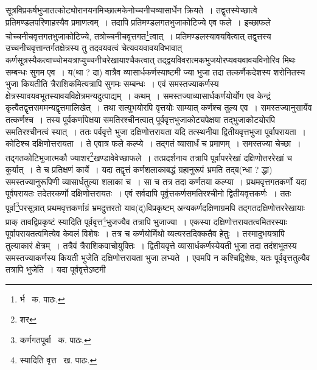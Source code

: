 \documentclass[11pt, openany]{book}
\begin{document}
\noindent सूत्रविप्रकर्षभुजातत्कोट्योरानयनमिच्छात्मकेनोच्चनीचव्यासार्धेन क्रियते~। तद्वृत्तस्येच्छात्वे प्रतिमण्डलपरिणाहस्यैव प्रमाणत्वम्~। तदापि
प्रतिमण्डलगतभुजाकोटिज्ये एव फले~। इच्छाफले चोच्चनीचवृत्तगतभुजाकोटिज्ये, तत्रोच्चनीचवृत्तगत\renewcommand{\thefootnote}{१}\footnote{र्भ \textendash\ क. पाठः.}त्वात्~। प्रतिमण्डलस्यावयवित्वात् तद्वृत्तस्य उच्चनीचवृत्तान्तर्गतक्षेत्रस्य तु तदवयवत्वं चेत्यवयवावयविभावात् कर्णसूत्रस्यैकत्वाच्चोभयत्राप्युच्चनीचरेखायाश्चैकत्वात् तद्द्वयविवरात्मकभुजयोरप्यवयवावयविनोरिव मिथः सम्बन्धः सुगम एव~। य(था ? दा) वात्रैव व्यासार्धकर्णस्याष्टमी ज्या भुजा तदा तत्कर्णैकदेशस्य शरोनितस्य भुजा कियतीति त्रैराशिकमित्यत्रापि सुगमः सम्बन्धः~। एवं समस्तज्याकर्णस्य क्षेत्रस्यावयवभूतस्यावयविक्षेत्रमन्यदुत्पाद्यम्~। कथम्~। समस्तज्याव्यासार्धकर्णयोर्योग एव केन्द्रं कृत्वैतद्वृत्तसममन्यद्वृत्तमालिखेत्~। तथा सत्युभयोरपि वृत्तयोः साम्यात् कर्णश्च तुल्य एव~। समस्तज्यानुसार्येव तत्कर्णश्च~। तस्य पूर्वकर्णापेक्षया समतिरश्चीनत्वात् पूर्ववृत्तभुजाकोट्यपेक्षया तद्भुजाकोट्योरपि समतिरश्चीनत्वं स्यात्~। ततः पर्ववृत्ते भुजा दक्षिणोत्तरायता यदि तत्स्थनीया द्वितीयवृत्तभुजा पूर्वापरायता~। कोटिश्च दक्षिणोत्तरायता~। ते एवात्र फले कल्प्ये~। तद्गतं व्यासार्धं च प्रमाणम्~। समस्तज्या चेच्छा~। तद्गतकोटिभुजात्मकौ ज्याशर\renewcommand{\thefootnote}{२}\footnote{शर}खण्डावेवेच्छाफले~। तत्प्रदर्शनाय तत्रापि पूर्वापररेखां
दक्षिणोत्तररेखां च कुर्यात्~। ते च प्रतिक्षणं कार्ये~। यदा तद्वृत्तं कर्णशलाकाबद्धं ग्रहानुरूपं भ्रमति तद्ब(न्धा ? द्धा) समस्तज्यानुरूपिणी
व्यासार्धतुल्या शलाका च~। सा च तत्र तदा कर्णतया कल्प्या~। प्रथमवृत्तगतकर्णो यदा पूर्वपरायतः तदेतरकर्णो दक्षिणोत्तरायतः~। एवं सर्वदापि
पूर्वृत्तकर्णसमतिरश्चीनो द्वितीयवृत्तकर्णः~। ततः पूर्वा\renewcommand{\thefootnote}{३}\footnote{कर्णगतपूर्वा \textendash\ क. पाठः.}परसूत्रात् प्रथमवृत्तकर्णाग्रं भ्रमदुत्तरतो याव(द्)विप्रकृष्टम् अन्यकर्णदक्षिणाग्रमपि तद्गतदक्षिणोत्तररेखायाः प्राक् तावद्विप्रकृष्टं स्यादिति पूर्ववृत्त\renewcommand{\thefootnote}{४}\footnote{स्यादिति वृत्त \textendash\ ख. पाठः.}भुजज्यैव तत्रापि भुजाज्या~। एकस्या दक्षिणोत्तरायतत्वमितरस्याः पूर्वापरायतत्वमित्येव केवलं विशेषः~। तत्र च कर्णयोर्मिथो व्यत्यस्तदिक्कतैव हेतुः~। तस्मादुभयत्रापि तुल्याकारं क्षेत्रम्~। तत्रैवं त्रैराशिकवाचोयुक्तिः~। द्वितीयवृत्ते व्यासार्धकर्णस्येयती भुजा तदा तदंशभूतस्य समस्तज्याकर्णस्य कियती भुजेति दक्षिणोत्तरायता भुजा लभ्यते~। एवमपि न कश्चिद्विशेषः, यतः पूर्ववृत्ततुल्यैव तत्रापि भुजेति~। यदा पूर्ववृत्तेऽष्टमी

\newpage
\end{document}
